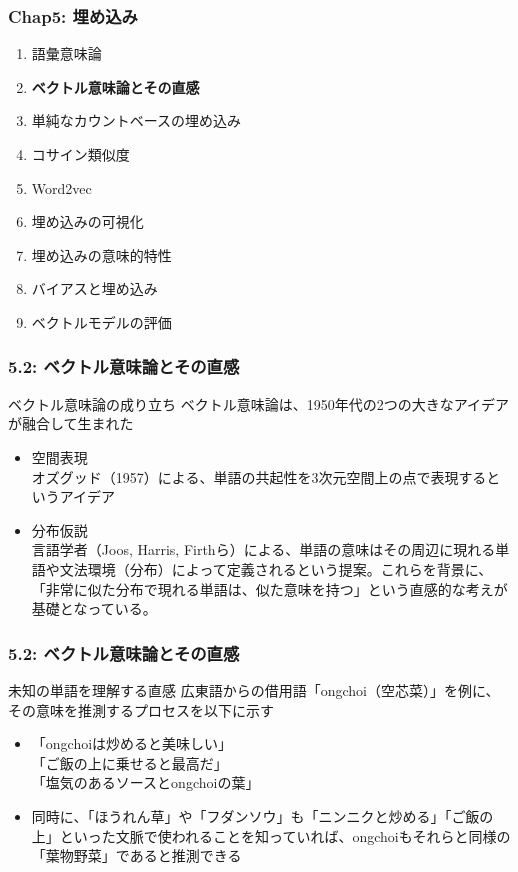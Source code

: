 \documentclass[unicode,11pt]{beamer} %
\begin{document}
\begin{frame}
    \frametitle{Chap5: 埋め込み}
    \begin{block}{}
        \begin{enumerate}
            \item 語彙意味論
            \item {\color{red}\textbf{ベクトル意味論とその直感}}
            \item 単純なカウントベースの埋め込み
            \item コサイン類似度
            \item Word2vec
            \item 埋め込みの可視化
            \item 埋め込みの意味的特性
            \item バイアスと埋め込み
            \item ベクトルモデルの評価
        \end{enumerate}
    \end{block}
\end{frame}

\begin{frame}
    \frametitle{5.2: ベクトル意味論とその直感}
    \begin{alertblock}{ベクトル意味論の成り立ち}
        ベクトル意味論は、1950年代の2つの大きなアイデアが融合して生まれた
        \begin{itemize}
            \item 空間表現\\オズグッド（1957）による、単語の共起性を3次元空間上の点で表現するというアイデア
            \item 分布仮説\\言語学者（Joos, Harris, Firthら）による、単語の意味はその周辺に現れる単語や文法環境（分布）によって定義されるという提案。これらを背景に、「非常に似た分布で現れる単語は、似た意味を持つ」という直感的な考えが基礎となっている。
        \end{itemize}
    \end{alertblock}
\end{frame}

\begin{frame}
    \frametitle{5.2: ベクトル意味論とその直感}
    \begin{alertblock}{未知の単語を理解する直感}
        広東語からの借用語「ongchoi（空芯菜）」を例に、その意味を推測するプロセスを以下に示す
        \begin{itemize}
            \item「ongchoiは炒めると美味しい」\\「ご飯の上に乗せると最高だ」\\「塩気のあるソースとongchoiの葉」
            \item 同時に、「ほうれん草」や「フダンソウ」も「ニンニクと炒める」「ご飯の上」といった文脈で使われることを知っていれば、ongchoiもそれらと同様の「葉物野菜」であると推測できる
        \end{itemize}
    \end{alertblock}
\end{frame}
\end{document}
